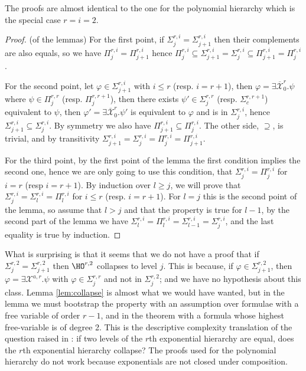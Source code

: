 \documentclass[a4paper,12pt]{article}
\theoremstyle{definition}
\renewcommand{\phi}{\varphi}
\newcommand{\hod}[2]{\ensuremath{\HO^{#1,#2}}}
\newcommand{\hoc}[3]{\ensuremath{\Sigma^{#1,#3}_{#2}}}
\newcommand{\cohoc}[3]{\ensuremath{\Pi^{#1,#3}_{#2}}}
\newcommand{\mc}{\mathcal}
\newcommand{\eh}[1]{$#1$th exponential hierarchy}
\newcommand{\olmc}[1]{\overline{\mathcal{#1}}}
\begin{document}
The proofs are almost identical to the one for the polynomial
hierarchy which is the special case $r=i=2$.

\begin{proof}(of the lemmas) 
  For the first point, if $\hoc{r}{j}{i}=\hoc{r}{j+1}{i}$ then their
  complements are also equals, so we have
  $\cohoc{r}{j}{i}=\cohoc{r}{j+1}{i}$ hence
  $\cohoc{r}{j}{i}\subseteq\hoc{r}{j+1}{i}=\hoc{r}{j}{i}\subseteq\cohoc{r}{j+1}{i}=\cohoc{r}{j}{i}$.

  For the second point, let $\phi\in\hoc{r}{j+1}{i}$ with $i\le r$
  (resp. $i=r+1$), then $\phi=\exists\olmc X_{0}^{r}.\psi$ where
  $\psi\in\cohoc{r}{j}{r}$ (resp. \cohoc{r}{j}{r+1}), then there
  exists $\psi'\in\hoc{r}{j}{r}$ (resp. \hoc{r}{c}{r+1}) equivalent to
  $\psi$, then $\phi'=\exists \olmc X^{r}_{0}.\psi'$ is equivalent to
  $\phi$ and is in $\hoc{r}{j}{i}$, hence
  $\hoc{r}{j+1}{i}\subseteq\hoc{r}{j}{i}$.  By symmetry we also have
  $\cohoc{r}{j+1}{i}\subseteq\cohoc{r}{j}{i}$. The other side,
  $\supseteq$, is trivial, and by transitivity
  $\hoc{r}{j+1}{i}=\hoc{r}{j}{i}=\cohoc{r}{j}{i}=\cohoc{r}{j+1}{i}$.

  For the third point, by the first point of the lemma the first
  condition implies the second one, hence we are only going to use
  this condition, that $\hoc{r}{j}{i}=\cohoc{r}{j}{i}$ for $i=r$
  (resp $i=r+1$). By induction over $l\ge j$, we will prove that
  $\hoc{r}{j}{i}=\hoc{r}{l}{i}=\cohoc{r}{l}{i}$ for $i\le r$
  (resp. $i=r+1$). For $l=j$ this is the second point of the lemma, so
  assume that $l>j$ and that the property is true for $l-1$, by the
  second part of the lemma we have 
  $\hoc{r}{l}{i}=\cohoc{r}{l}{i}=\hoc{r}{l-1}{i}=\hoc{r}{j}{i}$, and
  the last equality is true by induction.
\end{proof}

What is surprising is that it seems that we do not have a proof that if
$\hoc{r}{j}{2}=\hoc{r}{j+1}{2}$ then \hod{r}{2} collapses to level
$j$. This is because, if $\phi\in\hoc r{j+1}2$, then $\phi=\exists \mc
X^{a,r}.\psi$ with $\phi\in\hoc r{j}r$ and not in \hoc r{j}2; and we
have no hypothesis about this class.  Lemma \ref{lem:collapse} is
almost what we would have wanted, but in the lemma we must bootstrap
the property with an assumption over formulae with a free variable of
order $r-1$, and in the theorem with a formula whose highest
free-variable is of degree 2. This is the descriptive complexity
translation of the question raised in \cite{sky}: if two levels of the
\eh r are equal, does the \eh r collapse? The proofs used for the
polynomial hierarchy do not work because exponentials are not closed
under composition.
\end{document}
